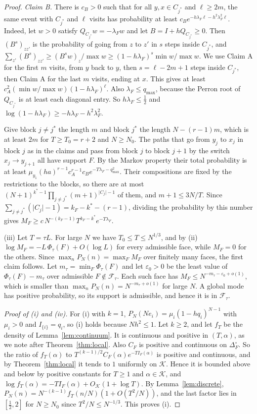 \begin{proof}
\emph{Claim B.} There is $c_B>0$ such that for all $y,x\in C_{j^*}$ and
$\ell\ge2m$, the same event with $C_{j^*}$ and $\ell$ visits has probability at
least $c_Be^{-h\lambda_F\ell-h^2\lambda_F^2\ell}$. Indeed, let $w>0$ satisfy
$Q_{C_{j^*}}w=-\lambda_Fw$ and let $B=I+hQ_{C_{j^*}}\ge0$. Then $(B^s)_{zz'}$ is
the probability of going from $z$ to $z'$ in $s$ steps inside $C_{j^*}$, and
$\sum_{z'}(B^s)_{zz'}\ge(B^sw)_z/\max w\ge(1-h\lambda_F)^s\min w/\max w$. We
use Claim A for the first $m$ visits, from $y$ back to $y$, then $s=\ell-2m+1$
steps inside $C_{j^*}$, then Claim A for the last $m$ visits, ending at $x$.
This gives at least $c_A^2(\min w/\max w)(1-h\lambda_F)^\ell$. Also
$\lambda_F\le q_{\max}$, because the Perron root of $Q_{C_{j^*}}$ is at least
each diagonal entry. So $h\lambda_F\le\frac12$ and
$\log(1-h\lambda_F)\ge-h\lambda_F-h^2\lambda_F^2$.

Give block $j\ne j^*$ the length $m$ and block $j^*$ the length $N-(r-1)m$,
which is at least $2m$ for $T\ge T_0=r+2$ and $N\ge N_0$. The paths that go
from $y_j$ to $x_j$ in block $j$ as in the claims and pass from block $j$ to
block $j+1$ by the switch $x_j\to y_{j+1}$ all have support $F$. By the Markov
property their total probability is at least
$\mu_{y_1}(ha)^{r-1}c_A^{r-1}c_Be^{-T\lambda_F-q_{\max}^2}$. Their compositions
are fixed by the restrictions to the blocks, so there are at most
$(N+1)^{k^*-1}\prod_{j\ne j^*}(m+1)^{\lvert C_j\rvert-1}$ of them, and
$m+1\le3N/T$. Since $\sum_{j\ne j^*}(\lvert C_j\rvert-1)=k_F-k^*-(r-1)$,
dividing the probability by this number gives
$M_F\ge c\,N^{-(k_F-1)}T^{k_F-k^*}e^{-T\lambda_F}$.

(iii) Let $T=\tau L$. For large $N$ we have $T_0\le T\le N^{1/3}$, and by (ii)
$\log M_F=-L\,\Phi_\tau(F)+O(\log L)$ for every admissible face, while
$M_F=0$ for the others. Since $\max_nP_N(n)=\max_FM_F$ over finitely many
faces, the first claim follows. Let $m_\tau=\min_F\Phi_\tau(F)$ and let
$\varepsilon_0>0$ be the least value of $\Phi_\tau(F)-m_\tau$ over admissible
$F\notin\mathcal F_\tau$. Each such face has
$M_F\le N^{-m_\tau-\varepsilon_0+o(1)}$, which is smaller than
$\max_nP_N(n)=N^{-m_\tau+o(1)}$ for large $N$. A global mode has positive
probability, so its support is admissible, and hence it is in
$\mathcal F_\tau$.

\emph{Proof of (i) and (iv).} For (i) with $k=1$,
$P_N(Ne_i)=\mu_i(1-hq_i)^{N-1}$ with $\mu_i>0$ and $I_{\{i\}}=q_i$, so (i)
holds because $Nh^2\le1$. Let $k\ge2$, and let $f_T$ be the density of
Lemma~\ref{lem:continuum}. It is continuous and positive in $(T,\alpha)$, as
we note after Theorem~\ref{thm:local}. Also $C_F$ is positive and continuous on $\Delta_F^\circ$. So the
ratio of $f_T(\alpha)$ to $T^{(k-1)/2}C_F(\alpha)e^{-TI_F(\alpha)}$ is positive
and continuous, and by Theorem~\ref{thm:local} it tends to $1$ uniformly on
$\mathcal K$. Hence it is bounded above and below by positive constants for
$T\ge1$ and $\alpha\in\mathcal K$, and $\log f_T(\alpha)=-TI_F(\alpha)+O_{\mathcal
K}(1+\log T)$. By Lemma~\ref{lem:discrete},
$P_N(n)=N^{-(k-1)}f_T(n/N)(1+O(T^2/N))$, and the last factor lies in
$[\frac12,2]$ for $N\ge N_0$ since $T^2/N\le N^{-1/3}$. This proves (i).


\end{proof}
